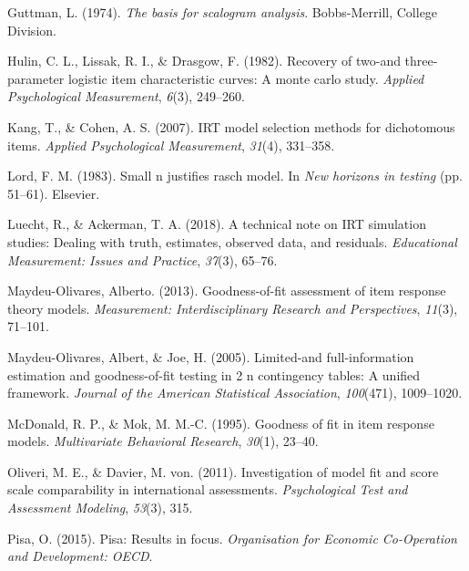 \documentclass[
  english,
  man,floatsintext]{apa7}
\newlength{\cslhangindent}
\newlength{\cslentryspacingunit} %
\newenvironment{CSLReferences}[2] %
 {%
  \setlength{\parindent}{0pt}
  \ifodd #1
  \let\oldpar\par
  \def\par{\hangindent=\cslhangindent\oldpar}
  \fi
  \setlength{\parskip}{#2\cslentryspacingunit}
 }%
 {}
\begin{document}
\begin{CSLReferences}{1}{0}
\leavevmode{}%
Guttman, L. (1974). \emph{The basis for scalogram analysis}. Bobbs-Merrill, College Division.

\leavevmode{}%
Hulin, C. L., Lissak, R. I., \& Drasgow, F. (1982). Recovery of two-and three-parameter logistic item characteristic curves: A monte carlo study. \emph{Applied Psychological Measurement}, \emph{6}(3), 249--260.

\leavevmode{}%
Kang, T., \& Cohen, A. S. (2007). IRT model selection methods for dichotomous items. \emph{Applied Psychological Measurement}, \emph{31}(4), 331--358.

\leavevmode{}%
Lord, F. M. (1983). Small n justifies rasch model. In \emph{New horizons in testing} (pp. 51--61). Elsevier.

\leavevmode{}%
Luecht, R., \& Ackerman, T. A. (2018). A technical note on IRT simulation studies: Dealing with truth, estimates, observed data, and residuals. \emph{Educational Measurement: Issues and Practice}, \emph{37}(3), 65--76.

\leavevmode{}%
Maydeu-Olivares, Alberto. (2013). Goodness-of-fit assessment of item response theory models. \emph{Measurement: Interdisciplinary Research and Perspectives}, \emph{11}(3), 71--101.

\leavevmode{}%
Maydeu-Olivares, Albert, \& Joe, H. (2005). Limited-and full-information estimation and goodness-of-fit testing in 2 n contingency tables: A unified framework. \emph{Journal of the American Statistical Association}, \emph{100}(471), 1009--1020.

\leavevmode{}%
McDonald, R. P., \& Mok, M. M.-C. (1995). Goodness of fit in item response models. \emph{Multivariate Behavioral Research}, \emph{30}(1), 23--40.

\leavevmode{}%
Oliveri, M. E., \& Davier, M. von. (2011). Investigation of model fit and score scale comparability in international assessments. \emph{Psychological Test and Assessment Modeling}, \emph{53}(3), 315.

\leavevmode{}%
Pisa, O. (2015). Pisa: Results in focus. \emph{Organisation for Economic Co-Operation and Development: OECD}.


\end{CSLReferences}
\end{document}
